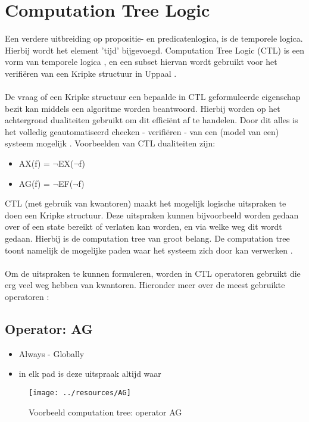 \documentclass{article}
\begin{document}
\newpage
\section{Computation Tree Logic}
  Een verdere uitbreiding op propositie- en predicatenlogica, is de temporele logica. Hierbij wordt het element 'tijd' bijgevoegd. Computation Tree Logic (CTL) is een vorm van temporele logica \cite{modelchecking}, en een subset hiervan wordt gebruikt voor het verifiëren van een Kripke structuur in Uppaal \cite{behrmann2006tutorial}.\\\\
  De vraag of een Kripke structuur een bepaalde in CTL geformuleerde eigenschap bezit kan middels een algoritme worden beantwoord. Hierbij worden op het achtergrond dualiteiten gebruikt om dit efficiënt af te handelen. Door dit alles is het volledig geautomatiseerd checken - verifiëren - van een (model van een) systeem mogelijk \cite{modelchecking}. Voorbeelden van CTL dualiteiten zijn:
  \begin{itemize}
    \item AX(f) = $\lnot$EX($\lnot$f)
    \item AG(f) = $\lnot$EF($\lnot$f)
  \end{itemize}
  CTL (met gebruik van kwantoren) maakt het mogelijk logische uitspraken te doen een Kripke structuur. Deze uitspraken kunnen bijvoorbeeld worden gedaan over of een state bereikt of verlaten kan worden, en via welke weg dit wordt gedaan. Hierbij is de computation tree van groot belang. De computation tree toont namelijk de mogelijke paden waar het systeem zich door kan verwerken \cite{modelchecking}.\\\\
  Om de uitspraken te kunnen formuleren, worden in CTL operatoren gebruikt die erg veel weg hebben van kwantoren. Hieronder meer over de meest gebruikte operatoren \cite{modelchecking}:

  \subsection{Operator: AG}
    \begin{itemize}
      \item Always - Globally
      \item in elk pad is deze uitspraak altijd waar
    \end{itemize}
    \begin{figure}[h]
      \centering
      \texttt{[image: ../resources/AG]}
      \caption{Voorbeeld computation tree: operator AG}
      \label{fig:ag}
    \end{figure}
\end{document}
